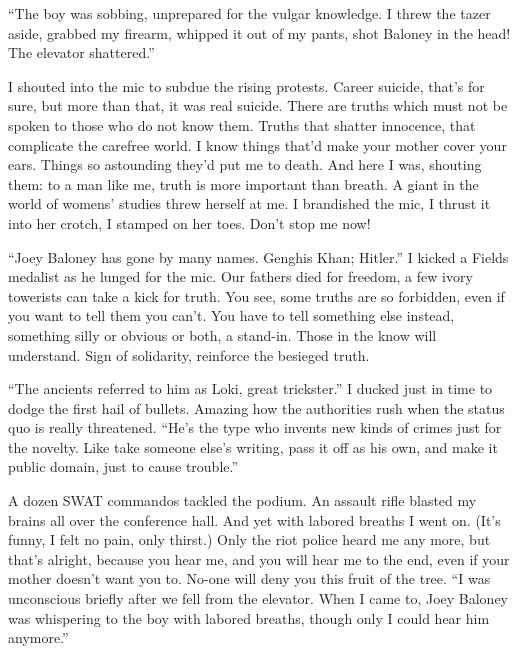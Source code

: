 \documentclass[oneside]{book}
\begin{document}
``The boy was sobbing, unprepared for the vulgar knowledge.
I threw the tazer aside, grabbed my firearm, whipped it out of my pants,
shot Baloney in the head!  The elevator shattered.''

I shouted into the mic to subdue the rising protests.
Career suicide, that's for sure, but more than that, it was real suicide.
There are truths which must not be spoken to those who do not know them.
Truths that shatter innocence, that complicate the carefree world.
I know things that'd make your mother cover your ears.
Things so astounding they'd put me to death.
And here I was, shouting them: to a man like me, truth
is more important than breath.
A giant in the world of womens' studies threw herself at me.
I brandished the mic, I thrust it into her crotch, I stamped on her toes.
Don't stop me now!

``Joey Baloney has gone by many names.  Genghis Khan; Hitler.''
I kicked a Fields medalist as he lunged for the mic.  Our fathers
died for freedom, a few ivory towerists can take a kick for truth.
You see, some truths are so forbidden, even if you want to tell them
you can't.  You have to tell something else instead, something silly or obvious or both,
a stand-in.  Those in the know will understand.
Sign of solidarity, reinforce the besieged truth.

``The ancients referred to him as Loki, great trickster.''
I ducked just in time to dodge the first hail of bullets.
Amazing how the authorities rush when the status quo is
really threatened.
``He's the type who invents new kinds of crimes just for the novelty.
Like take someone else's writing, pass it off as his own, and make
it public domain, just to cause trouble.''

A dozen SWAT commandos tackled the podium.
An assault rifle blasted my brains all over the conference hall.
And yet with labored breaths I went on.
(It's funny, I felt no pain, only thirst.)
Only the riot police heard me any more, but that's alright,
because you hear me, and you will hear me to the end, even if your mother
doesn't want you to.  No-one will deny you this fruit of the tree.
``I was unconscious briefly after we fell from the elevator.
When I came to, Joey Baloney was whispering to the boy with labored breaths,
though only I could hear him anymore.''
\end{document}
